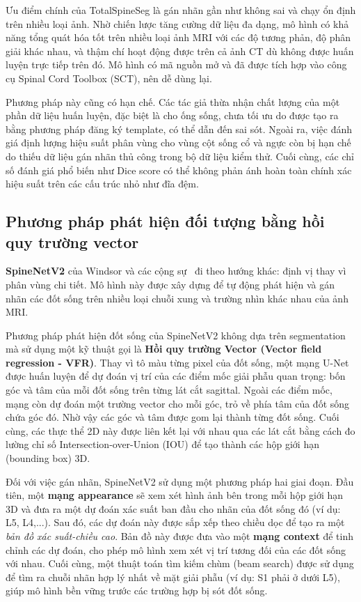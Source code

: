 Ưu điểm chính của TotalSpineSeg là gán nhãn gần như không sai và chạy ổn định trên nhiều loại ảnh. Nhờ chiến lược tăng cường dữ liệu đa dạng, mô hình có khả năng tổng quát hóa tốt trên nhiều loại ảnh MRI với các độ tương phản, độ phân giải khác nhau, và thậm chí hoạt động được trên cả ảnh CT dù không được huấn luyện trực tiếp trên đó. Mô hình có mã nguồn mở và đã được tích hợp vào công cụ Spinal Cord Toolbox (SCT), nên dễ dùng lại.

Phương pháp này cũng có hạn chế. Các tác giả thừa nhận chất lượng của một phần dữ liệu huấn luyện, đặc biệt là cho ống sống, chưa tối ưu do được tạo ra bằng phương pháp đăng ký template, có thể dẫn đến sai sót. Ngoài ra, việc đánh giá định lượng hiệu suất phân vùng cho vùng cột sống cổ và ngực còn bị hạn chế do thiếu dữ liệu gán nhãn thủ công trong bộ dữ liệu kiểm thử. Cuối cùng, các chỉ số đánh giá phổ biến như Dice score có thể không phản ánh hoàn toàn chính xác hiệu suất trên các cấu trúc nhỏ như đĩa đệm.

\subsection{Phương pháp phát hiện đối tượng bằng hồi quy trường vector}
\textbf{SpineNetV2} của Windsor và các cộng sự~\cite{windsor2022spinenetv2} đi theo hướng khác: định vị thay vì phân vùng chi tiết. Mô hình này được xây dựng để tự động phát hiện và gán nhãn các đốt sống trên nhiều loại chuỗi xung và trường nhìn khác nhau của ảnh MRI.

Phương pháp phát hiện đốt sống của SpineNetV2 không dựa trên segmentation mà sử dụng một kỹ thuật gọi là \textbf{Hồi quy trường Vector (Vector field regression - VFR)}. Thay vì tô màu từng pixel của đốt sống, một mạng U-Net được huấn luyện để dự đoán vị trí của các điểm mốc giải phẫu quan trọng: bốn góc và tâm của mỗi đốt sống trên từng lát cắt sagittal. Ngoài các điểm mốc, mạng còn dự đoán một trường vector cho mỗi góc, trỏ về phía tâm của đốt sống chứa góc đó. Nhờ vậy các góc và tâm được gom lại thành từng đốt sống. Cuối cùng, các thực thể 2D này được liên kết lại với nhau qua các lát cắt bằng cách đo lường chỉ số Intersection-over-Union (IOU) để tạo thành các hộp giới hạn (bounding box) 3D.

Đối với việc gán nhãn, SpineNetV2 sử dụng một phương pháp hai giai đoạn. Đầu tiên, một \textbf{mạng appearance} sẽ xem xét hình ảnh bên trong mỗi hộp giới hạn 3D và đưa ra một dự đoán xác suất ban đầu cho nhãn của đốt sống đó (ví dụ: L5, L4,...). Sau đó, các dự đoán này được sắp xếp theo chiều dọc để tạo ra một \textit{bản đồ xác suất-chiều cao}. Bản đồ này được đưa vào một \textbf{mạng context} để tinh chỉnh các dự đoán, cho phép mô hình xem xét vị trí tương đối của các đốt sống với nhau. Cuối cùng, một thuật toán tìm kiếm chùm (beam search) được sử dụng để tìm ra chuỗi nhãn hợp lý nhất về mặt giải phẫu (ví dụ: S1 phải ở dưới L5), giúp mô hình bền vững trước các trường hợp bị sót đốt sống.

